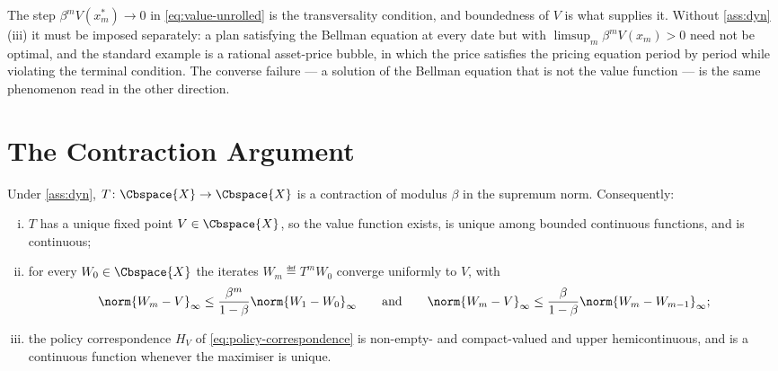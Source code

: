 \begin{remark}\label{rem:transversality}
	The step $\beta^{m}V(x_m^{\ast})\to0$ in \eqref{eq:value-unrolled} is the
	transversality condition, and boundedness of $V$ is what supplies it. Without
	\autoref{ass:dyn}(iii) it must be imposed separately: a plan satisfying the
	Bellman equation at every date but with
	$\limsup_m\beta^{m}V(x_m)>0$ need not be optimal, and the standard example is a
	rational asset-price bubble, in which the price satisfies the pricing equation
	period by period while violating the terminal condition. The converse failure ---
	a solution of the Bellman equation that is not the value function --- is the same
	phenomenon read in the other direction.
\end{remark}

\section{The Contraction Argument}\label{sec:dyn-contraction}

\begin{theorem}\label{thm:bellman-contraction}
	Under \autoref{ass:dyn}, $T\colon\Cbspace{X}\to\Cbspace{X}$ is a
	contraction of modulus $\beta$ in the supremum norm. Consequently:
	\begin{enumerate}[(i)]
		\item $T$ has a unique fixed point $V\in\Cbspace{X}$, so the value function
		      exists, is unique among bounded continuous functions, and is continuous;
		\item for every $W_0\in\Cbspace{X}$ the iterates $W_m\eqdef T^{m}W_0$
		      converge uniformly to $V$, with
		      \begin{equation}\label{eq:vfi-error}
			      \norm{W_m-V}_\infty\leq\frac{\beta^{m}}{1-\beta}\norm{W_1-W_0}_\infty
			      \qquad\text{and}\qquad
			      \norm{W_m-V}_\infty\leq\frac{\beta}{1-\beta}\norm{W_m-W_{m-1}}_\infty;
		      \end{equation}
		\item the policy correspondence $H_V$ of \eqref{eq:policy-correspondence} is
		      non-empty- and compact-valued and upper hemicontinuous, and is a
		      continuous function whenever the maximiser is unique.
	\end{enumerate}
\end{theorem}

